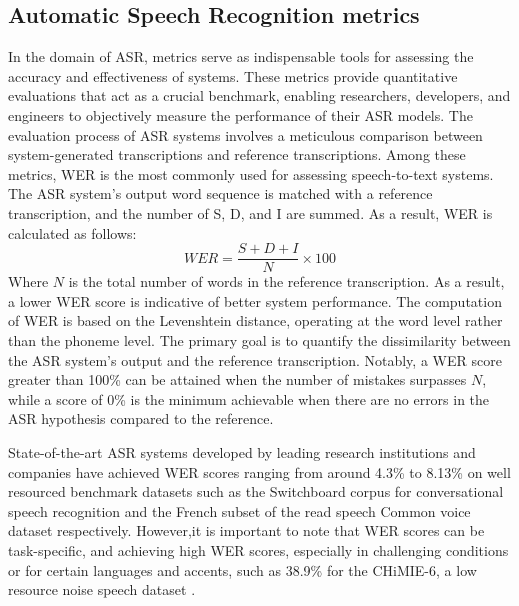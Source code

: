 \subsection{Automatic Speech Recognition metrics}%
In the domain of \ac{ASR}, metrics serve as indispensable tools for assessing the accuracy and effectiveness of systems. These metrics provide quantitative evaluations that act as a crucial benchmark, enabling researchers, developers, and engineers to objectively measure the performance of their \ac{ASR} models. The evaluation process of \ac{ASR} systems involves a meticulous comparison between system-generated transcriptions and reference transcriptions. Among these metrics, \ac{WER} is the most commonly used for assessing speech-to-text systems. The ASR system's output word sequence is matched with a reference transcription, and the number of \ac{S}, \ac{D}, and \ac{I} are summed. As a result, \ac{WER} is calculated as follows:
\begin{equation}
    WER = \frac{S  + D +I}{N} \times 100
\end{equation}
Where $N$ is the total number of words in the reference transcription. As a result, a lower \ac{WER} score is indicative of better system performance. The computation of \ac{WER} is based on the Levenshtein distance, operating at the word level rather than the phoneme level. The primary goal is to quantify the dissimilarity between the \ac{ASR} system's output and the reference transcription. Notably, a \ac{WER} score greater than 100\% can be attained when the number of mistakes surpasses $N$, while a score of 0\% is the minimum achievable when there are no errors in the \ac{ASR} hypothesis compared to the reference.

State-of-the-art \ac{ASR} systems developed by leading research institutions and companies have achieved \ac{WER} scores ranging from around 4.3\%  to 8.13\% on well resourced benchmark datasets such as the Switchboard corpus for conversational speech recognition \cite{tuske2021limit} and the French subset of the read speech Common voice dataset \cite{bermuth2021scribosermo} respectively. However,it is important to note that \ac{WER} scores can be task-specific, and achieving high \ac{WER} scores, especially in challenging conditions or for certain languages and accents, such as 38.9\% for the CHiMIE-6, a low resource noise speech dataset \cite{chan2021speechstew}.

